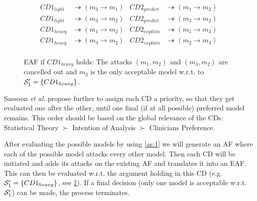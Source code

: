 \begin{table}[hbtp]
	\begin{align*}
		CD1_{light} &\twoheadrightarrow (m_3 \rightarrow m_1) & CD2_{predict} &\twoheadrightarrow (m_1 \rightarrow m_2)\\
		CD1_{light} &\twoheadrightarrow (m_3 \rightarrow m_2) & CD2_{predict} &\twoheadrightarrow (m_3 \rightarrow m_2)\\
		CD1_{heavy} &\twoheadrightarrow (m_1 \rightarrow m_2) & CD2_{explain} &\twoheadrightarrow (m_1 \rightarrow m_3)\\
		CD1_{heavy} &\twoheadrightarrow (m_3 \rightarrow m_2) & CD2_{explain} &\twoheadrightarrow (m_2 \rightarrow m_3)\\
	\end{align*}
	\caption{Orders over models derived from the two different \glspl{CD} (see ).}
	\label{tab:orders}
\end{table}

\begin{figure}[hbtp]
	\centering
	
	\caption{\gls{EAF} if $CD1_{heavy}$ holds: The attacks $(m_1,m_2)$ and $(m_3,m_2)$ are cancelled out and $m_3$ is the only acceptable model w.r.t. to $\S_1' = \{CD1_{heavy}\}$.}
	\label{fig:cd1_heavy}
\end{figure}

Sassoon \textit{et al.} propose further to assign each \gls{CD} a priority, so that they get evaluated one after the other, until one final (if at all possible) preferred model remains. This order should be based on the global relevance of the \glspl{CD}: Statistical Theory $\succ$ Intention of Analysis $\succ$ Clinicians Preference. 

After evaluating the possible models by using \autoref{as:1} we will generate an \gls{AF} where each of the possible model attacks every other model. Then each \gls{CD} will be initiated and adds its attacks on the existing \gls{AF} and translates it into an \gls{EAF}. This can then be evaluated w.r.t. the argument holding in this \gls{CD} (e.g. $\S_1' = \{CD1_{heavy}\}$, see \cref{fig:cd1_heavy}). If a final decision (only one model is acceptable w.r.t. $\S_1'$) can be made, the process terminates. 


